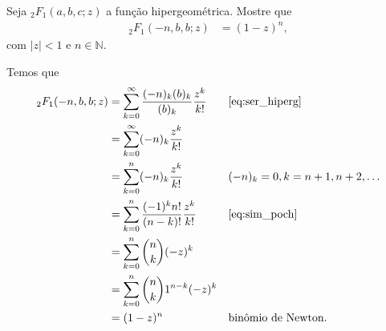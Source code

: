 \documentclass[a4paper,12pt, leqno, answers]{exam}
\begin{document}
\begin{questions}
    \question[P2 de 2006] Seja ${}_2F_1(a, b, c; z)$ a fun\c{c}\~{a}o hipergeom\'{e}trica. Mostre que
    \begin{align*}
        {}_2F_1(-n, b, b; z) &= (1 - z)^n,
    \end{align*}
    com $|z| < 1$ e $n \in \mathbb{N}$.
    \begin{solution}
        Temos que
        \begin{align*}
            {}_2F_1(-n, b, b; z) &= \sum_{k = 0}^\infty \frac{(-n)_k (b)_k}{(b)_k} \frac{z^k}{k!} && \text{\eqref{eq:ser_hiperg}} \\
            &= \sum_{k = 0}^\infty (-n)_k \frac{z^k}{k!} \\
            &= \sum_{k = 0}^n (-n)_k \frac{z^k}{k!} && (-n)_k = 0, k = n + 1, n + 2, \ldots \\
            &= \sum_{k = 0}^n \frac{(-1)^k n!}{(n - k)!} \frac{z^k}{k!} && \text{\eqref{eq:sim_poch}} \\
            &= \sum_{k = 0}^n \binom{n}{k} (-z)^k \\
            &= \sum_{k = 0}^n \binom{n}{k} 1^{n - k} (-z)^k \\
            &= (1 - z)^n && \text{bin\^{o}mio de Newton.}
        \end{align*}
    \end{solution}


\end{questions}
\end{document}

